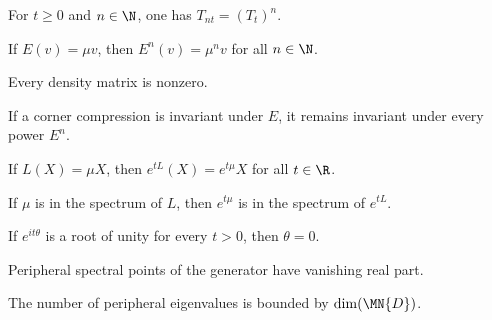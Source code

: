 \begin{theorem}
    \leanok
    For $t\ge 0$ and $n\in\N$, one has
    $T_{nt} = (T_t)^n$.
\end{theorem}

\begin{theorem}
    \leanok
    If $E(v)=\mu v$, then $E^n(v)=\mu^n v$ for all $n\in\N$.
\end{theorem}

\begin{lemma}
    \leanok
    Every density matrix is nonzero.
\end{lemma}

\begin{theorem}
    \leanok
    If a corner compression is invariant under $E$, it remains invariant under
    every power $E^n$.
\end{theorem}

\begin{theorem}
    \leanok
    If $L(X)=\mu X$, then
    $e^{tL}(X)=e^{t\mu}X$ for all $t\in\R$.
\end{theorem}

\begin{theorem}
    \leanok
    If $\mu$ is in the spectrum of $L$, then $e^{t\mu}$ is in the spectrum
    of $e^{tL}$.
\end{theorem}

\begin{theorem}
    \leanok
    If $e^{it\theta}$ is a root of unity for every $t>0$, then $\theta=0$.
\end{theorem}

\begin{theorem}
    \leanok
    Peripheral spectral points of the generator have vanishing real part.
\end{theorem}

\begin{theorem}
    \leanok
    The number of peripheral eigenvalues is bounded by $\dim(\MN{D})$.
\end{theorem}

